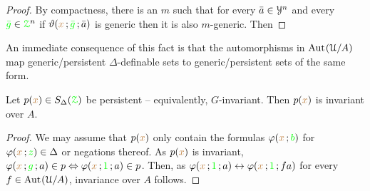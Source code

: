 \begin{proof}
  By compactness, there is an $m$ such that for every $\bar a\in\EuScript Y^n$ and every ${\color{green}\bar g}\in{\color{green}\EuScript Z}^n$ if $\vartheta({\color{brown} x}\,;{\color{green}\bar g}\,;\bar a)$ is generic then it is also $m$-generic.
  Then

\end{proof}

An immediate consequence of this fact is that the automorphisms in ${\rm Aut\kern.15ex}(\EuScript U/A)$ map generic/persistent $\Delta$-definable sets to generic/persistent sets of the same form.



\begin{fact} 
  Let $p({\color{brown} x})\in S_\Delta({\color{green}\EuScript Z})$ be persistent -- equivalently, $G$-invariant.
  Then $p({\color{brown} x})$ is invariant over $A$.
\end{fact}

\begin{proof}
  We may assume that $p({\color{brown} x})$ only contain the formulas $\varphi({\color{brown} x}\,;{\color{green} b})$ for $\varphi({\color{brown} x}\,;{\color{green} z})\in\Delta$ or negations thereof.
  As $p({\color{brown} x})$ is invariant, $\varphi({\color{brown} x}\,;{\color{green} g}\,;a)\in p\Leftrightarrow\varphi({\color{brown} x}\,;{\color{green} 1}\,;a)\in p$.
  Then, as $\varphi({\color{brown} x}\,;{\color{green} 1}\,;a)\leftrightarrow\varphi({\color{brown} x}\,;{\color{green} 1}\,;fa)$ for every $f\in{\rm Aut\kern.15ex}(\EuScript U/A)$, invariance over $A$ follows.
\end{proof}



